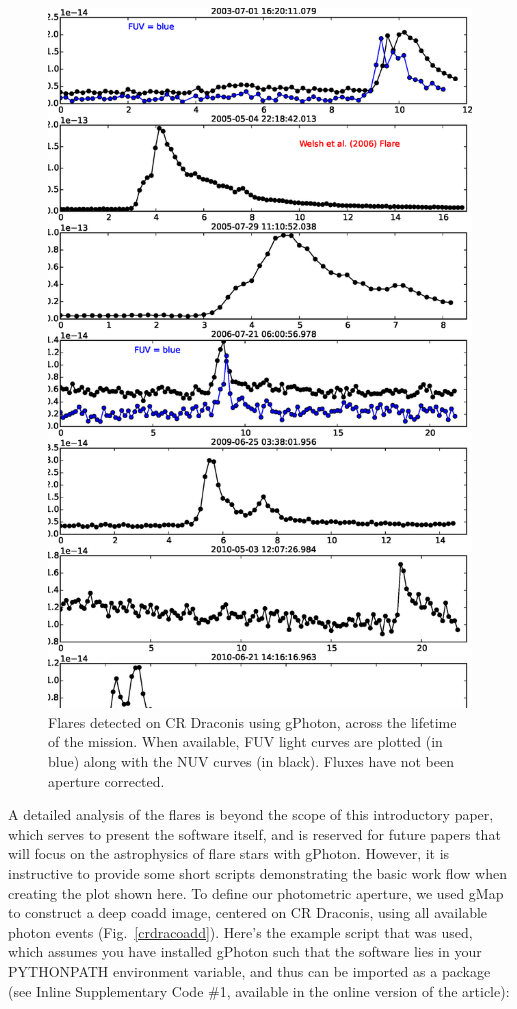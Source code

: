 \documentclass[5p]{elsarticle}
\begin{document}
\begin{figure}
\includegraphics[scale=0.375]{FigCRDraFlares.eps}
\caption{Flares detected on CR Draconis using gPhoton, across the lifetime of the mission.  When available, FUV light curves are plotted (in blue) along with the NUV curves (in black).  Fluxes have not been aperture corrected. \label{crdraflares}}
\end{figure}

A detailed analysis of the flares is beyond the scope of this introductory paper, which serves to present the software itself, and is reserved for future papers that will focus on the astrophysics of flare stars with gPhoton.  However, it is instructive to provide some short scripts demonstrating the basic work flow when creating the plot shown here.  To define our photometric aperture, we used gMap to construct a deep coadd image, centered on CR Draconis, using all available photon events (Fig.\ \ref{crdracoadd}).  Here's the example script that was used, which assumes you have installed gPhoton such that the software lies in your PYTHONPATH environment variable, and thus can be imported as a package (see Inline Supplementary Code \#1, available in the online version of the article):
\end{document}
